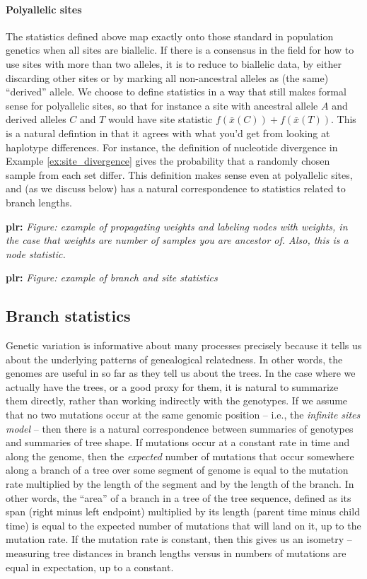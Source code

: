 \documentclass{article}
\newcommand{\aw}{{\bar x}} %
\newcommand{\plr}[1]{{\color{blue}\textbf{plr:} \it #1}}
\begin{document}
\paragraph{Polyallelic sites}
The statistics defined above map exactly onto those standard in population genetics
when all sites are biallelic. 
If there is a consensus in the field
for how to use sites with more than two alleles,
it is to reduce to biallelic data, by either discarding other sites
or by marking all non-ancestral alleles as (the same) ``derived'' allele.
We choose to define statistics in a way that still makes formal sense for polyallelic sites,
so that for instance a site with ancestral allele $A$ and derived alleles $C$ and $T$
would have site statistic $f(\aw(C)) + f(\aw(T))$.
This is a natural defintion in that it agrees with what you'd get
from looking at haplotype differences.
For instance, the definition of nucleotide divergence in Example \ref{ex:site_divergence}
gives the probability that a randomly chosen sample from each set differ.
This definition makes sense even at polyallelic sites,
and (as we discuss below) has a natural correspondence to statistics related to branch lengths.

\plr{Figure: example of propagating weights and labeling nodes with weights,
    in the case that weights are number of samples you are ancestor of.
    Also, this is a node statistic.}

\plr{Figure: example of branch and site statistics}


\subsection*{Branch statistics}

Genetic variation is informative about many processes
precisely because it tells us about the underlying patterns of genealogical relatedness.
In other words, the genomes are useful in so far as they tell us about the trees.
In the case where we actually have the trees, or a good proxy for them,
it is natural to summarize them directly, rather than working indirectly with the genotypes.
If we assume that no two mutations occur at the same genomic position --
i.e., the \emph{infinite sites model} --
then there is a natural correspondence between summaries of genotypes and summaries of tree shape.
If mutations occur at a constant rate in time and along the genome,
then the \emph{expected} number of mutations that occur somewhere along a branch of a tree
over some segment of genome
is equal to the mutation rate multiplied by the length of the segment and by the length of the branch.
In other words, the ``area'' of a branch in a tree of the tree sequence,
defined as its span (right minus left endpoint) multiplied by its length (parent time minus child time)
is equal to the expected number of mutations that will land on it, up to the mutation rate.
If the mutation rate is constant,
then this gives us an isometry --
measuring tree distances in branch lengths versus in numbers of mutations
are equal in expectation, up to a constant.
\end{document}
